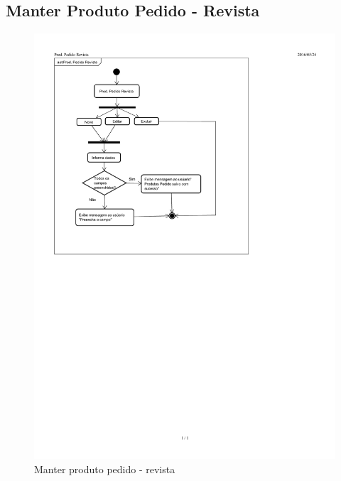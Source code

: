 \documentclass[chapter=TITLE,12pt,oneside,a4paper,english,french,sumario=tradicional,spanish,brazil,]{abntex2}
\begin{document}
\subsection{Manter Produto Pedido - Revista}
\begin{figure}[h]\centering
	\includegraphics[scale=1.61]{produto-pedido-revista.pdf}\caption{Manter produto pedido - revista}
\end{figure}

\newpage
\end{document}
